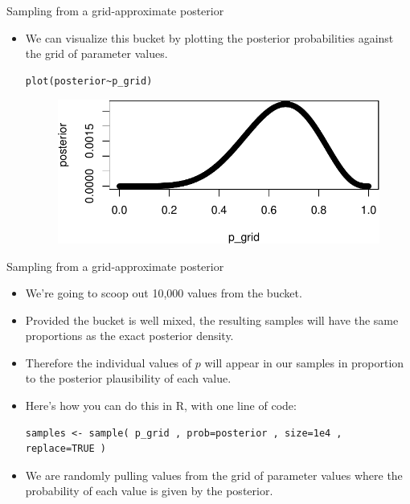 \documentclass[handout]{beamer}
\begin{document}
\begin{frame}[fragile]{Sampling from a grid-approximate posterior}
\scriptsize{
\begin{itemize}

\item We can visualize this bucket by plotting the posterior probabilities against the grid of parameter values.

\begin{verbatim}
plot(posterior~p_grid)

\end{verbatim}

   \begin{figure}[h!]
	\centering
	\includegraphics[scale=0.85]{pics/post_grid.pdf}
	\end{figure}



\end{itemize}



}

\end{frame}



\begin{frame}[fragile]{Sampling from a grid-approximate posterior}
\scriptsize{
\begin{itemize}

\item We’re going to scoop out 10,000 values from the bucket.

\item Provided the bucket is well mixed, the resulting samples will have the same proportions as the exact posterior density. 

\item Therefore the individual values of $p$ will appear in our samples in proportion to the posterior plausibility of each value.

\item Here’s how you can do this in R, with one line of code:

\begin{verbatim}
samples <- sample( p_grid , prob=posterior , size=1e4 , 
replace=TRUE )
\end{verbatim}
\item We are randomly pulling values from the grid of parameter values where the probability of each value is given by the posterior.

 
\end{itemize}



} 

\end{frame}
\end{document}
